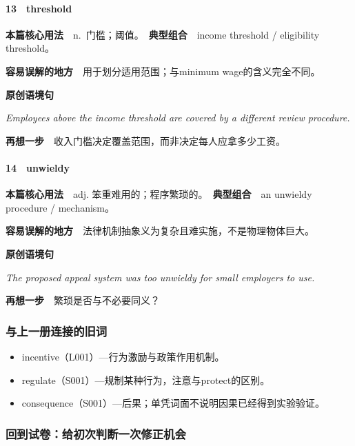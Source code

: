 \documentclass[
  11pt,
]{ctexart}
\renewenvironment{quote}{\begin{tcolorbox}[enhanced,breakable,colback=sand,colframe=primary!22,boxrule=0.4pt,arc=2pt,left=2.6mm,right=2.6mm,top=1.6mm,bottom=1.6mm]\itshape}{\end{tcolorbox}}
\begin{document}
\paragraph{13　threshold}\label{threshold}

\textbf{本篇核心用法}　n.~门槛；阈值。　\textbf{典型组合}　income
threshold / eligibility threshold。

\textbf{容易误解的地方}　用于划分适用范围；与minimum
wage的含义完全不同。

\textbf{原创语境句}

\begin{quote}
Employees above the income threshold are covered by a different review
procedure.
\end{quote}

\textbf{再想一步}　收入门槛决定覆盖范围，而非决定每人应拿多少工资。

\paragraph{14　unwieldy}\label{unwieldy}

\textbf{本篇核心用法}　adj.
笨重难用的；程序繁琐的。　\textbf{典型组合}　an unwieldy procedure /
mechanism。

\textbf{容易误解的地方}　法律机制抽象义为复杂且难实施，不是物理物体巨大。

\textbf{原创语境句}

\begin{quote}
The proposed appeal system was too unwieldy for small employers to use.
\end{quote}

\textbf{再想一步}　繁琐是否与不必要同义？

\subsubsection{与上一册连接的旧词}\label{ux4e0eux4e0aux4e00ux518cux8fdeux63a5ux7684ux65e7ux8bcd-1}

\begin{itemize}
\item
  incentive（L001）---行为激励与政策作用机制。
\item
  regulate（S001）---规制某种行为，注意与protect的区别。
\item
  consequence（S001）---后果；单凭词面不说明因果已经得到实验验证。
\end{itemize}

\subsubsection{回到试卷：给初次判断一次修正机会}\label{ux56deux5230ux8bd5ux5377ux7ed9ux521dux6b21ux5224ux65adux4e00ux6b21ux4feeux6b63ux673aux4f1a-1}
\end{document}
